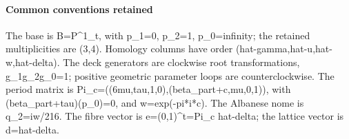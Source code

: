 \documentclass[11pt,a4paper]{article}
\theoremstyle{plain}
\theoremstyle{definition}
\begin{document}
\paragraph{Common conventions retained}
The base is B=P\textasciicircum{}1\_\allowbreak{}t, with p\_\allowbreak{}1=0, p\_\allowbreak{}2=1, p\_\allowbreak{}0=infinity; the retained multiplicities are (3,4). Homology columns have order (hat-gamma,hat-u,hat-w,hat-delta). The deck generators are clockwise root transformations, g\_\allowbreak{}1g\_\allowbreak{}2g\_\allowbreak{}0=1; positive geometric parameter loops are counterclockwise. The period matrix is Pi\_\allowbreak{}c=((6mu,tau,1,0),(beta\_\allowbreak{}part+c,mu,0,1)), with (beta\_\allowbreak{}part+tau)(p\_\allowbreak{}0)=0, and w=exp(-pi*i*c). The Albanese nome is q\_\allowbreak{}2=iw/\allowbreak{}216. The fibre vector is e=(0,1)\textasciicircum{}t=Pi\_\allowbreak{}c hat-delta; the lattice vector is d=hat-delta.
\end{document}
